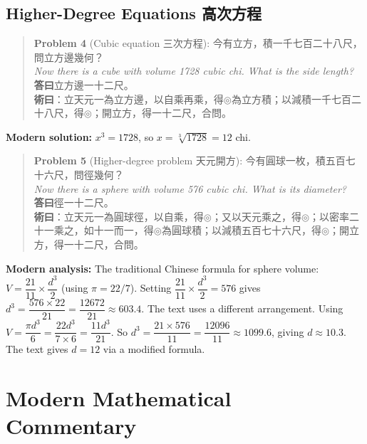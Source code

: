 \documentclass[11pt,a4paper]{article}
\newenvironment{vol3problembox}{%
  \begin{quote}
  \itshape
  \color{vol3color}
}{%
  \end{quote}
}
\begin{document}
\subsection{Higher-Degree Equations 高次方程}

\begin{vol3problembox}
\textbf{Problem 4} (Cubic equation 三次方程): 今有立方，積一千七百二十八尺，問立方邊幾何？\\[0.2cm]
\textit{Now there is a cube with volume 1728 cubic chi. What is the side length?}\\[0.2cm]
\textbf{答曰}立方邊一十二尺。\\[0.2cm]
\textbf{術曰}：立天元一為立方邊，以自乘再乘，得$\circledcirc$為立方積；以減積一千七百二十八尺，得$\circledcirc$；開立方，得一十二尺，合問。
\end{vol3problembox}

\textbf{Modern solution:} $x^3 = 1728$, so $x = \sqrt[3]{1728} = 12$ chi.

\vspace{0.3cm}

\begin{vol3problembox}
\textbf{Problem 5} (Higher-degree problem 天元開方): 今有圓球一枚，積五百七十六尺，問徑幾何？\\[0.2cm]
\textit{Now there is a sphere with volume 576 cubic chi. What is its diameter?}\\[0.2cm]
\textbf{答曰}徑一十二尺。\\[0.2cm]
\textbf{術曰}：立天元一為圓球徑，以自乘，得$\circledcirc$；又以天元乘之，得$\circledcirc$；以密率二十一乘之，如十一而一，得$\circledcirc$為圓球積；以減積五百七十六尺，得$\circledcirc$；開立方，得一十二尺，合問。
\end{vol3problembox}

\textbf{Modern analysis:} The traditional Chinese formula for sphere volume: $V = \dfrac{21}{11} \times \dfrac{d^3}{2}$ (using $\pi = 22/7$). Setting $\dfrac{21}{11} \times \dfrac{d^3}{2} = 576$ gives $d^3 = \dfrac{576 \times 22}{21} = \dfrac{12672}{21} \approx 603.4$. The text uses a different arrangement. Using $V = \dfrac{\pi d^3}{6} = \dfrac{22d^3}{7 \times 6} = \dfrac{11d^3}{21}$. So $d^3 = \dfrac{21 \times 576}{11} = \dfrac{12096}{11} \approx 1099.6$, giving $d \approx 10.3$. The text gives $d = 12$ via a modified formula.

\newpage

\section{Modern Mathematical Commentary}
\end{document}
